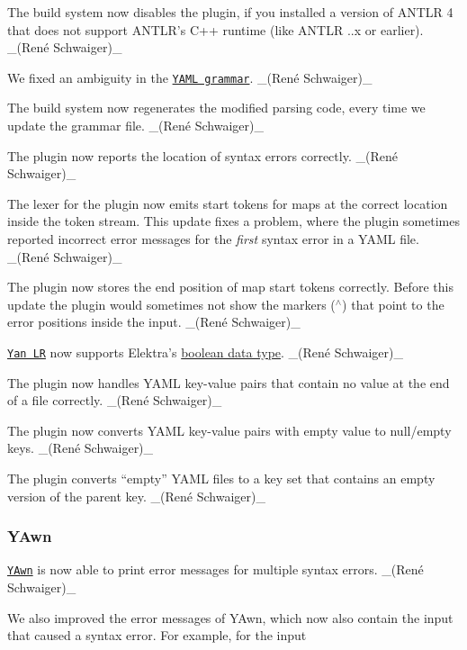 \begin{DoxyItemize}
\item The build system now disables the plugin, if you installed a version of A\+N\+T\+LR 4 that does not support A\+N\+T\+L\+R’s C++ runtime (like A\+N\+T\+LR {..\+x} or earlier). \+\_\+(René Schwaiger)\+\_\+
\item We fixed an ambiguity in the \href{https://master.libelektra.org/src/plugins/yanlr/YAML.g4}{\tt Y\+A\+ML grammar}. \+\_\+(René Schwaiger)\+\_\+
\item The build system now regenerates the modified parsing code, every time we update the grammar file. \+\_\+(René Schwaiger)\+\_\+
\item The plugin now reports the location of syntax errors correctly. \+\_\+(René Schwaiger)\+\_\+
\item The lexer for the plugin now emits start tokens for maps at the correct location inside the token stream. This update fixes a problem, where the plugin sometimes reported incorrect error messages for the {\itshape first} syntax error in a Y\+A\+ML file. \+\_\+(René Schwaiger)\+\_\+
\item The plugin now stores the end position of map start tokens correctly. Before this update the plugin would sometimes not show the markers ({\ttfamily $^\wedge$}) that point to the error positions inside the input. \+\_\+(René Schwaiger)\+\_\+
\item \href{https://www.libelektra.org/plugins/yanlr}{\tt Yan LR} now supports Elektra’s \hyperlink{doc_decisions_bool_md}{boolean data type}. \+\_\+(René Schwaiger)\+\_\+
\item The plugin now handles Y\+A\+ML key-\/value pairs that contain no value at the end of a file correctly. \+\_\+(René Schwaiger)\+\_\+
\item The plugin now converts Y\+A\+ML key-\/value pairs with empty value to null/empty keys. \+\_\+(René Schwaiger)\+\_\+
\item The plugin converts “empty” Y\+A\+ML files to a key set that contains an empty version of the parent key. \+\_\+(René Schwaiger)\+\_\+
\end{DoxyItemize}

\subsubsection*{Y\+Awn}


\begin{DoxyItemize}
\item \href{https://www.libelektra.org/plugins/yawn}{\tt Y\+Awn} is now able to print error messages for multiple syntax errors. \+\_\+(René Schwaiger)\+\_\+
\item We also improved the error messages of Y\+Awn, which now also contain the input that caused a syntax error. For example, for the input
\end{DoxyItemize}


